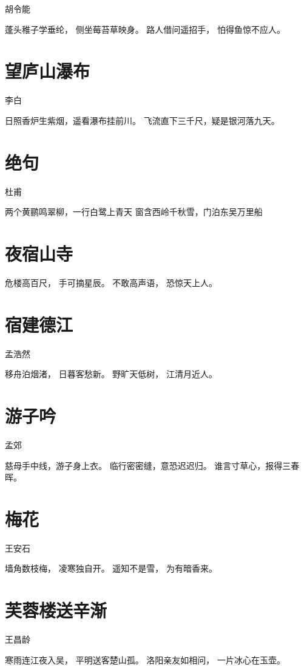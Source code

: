 \documentclass[12pt,UTF8]{ctexbook}
\begin{document}
胡令能

蓬头稚子学垂纶，
侧坐莓苔草映身。
路人借问遥招手，
怕得鱼惊不应人。

\section{望庐山瀑布}

李白

日照香炉生紫烟，遥看瀑布挂前川。
飞流直下三千尺，疑是银河落九天。

\section{绝句}

杜甫

两个黄鹂鸣翠柳，一行白鹭上青天
窗含西岭千秋雪，门泊东吴万里船

\section{夜宿山寺}

危楼高百尺，
手可摘星辰。
不敢高声语，
恐惊天上人。

\section{宿建德江}

孟浩然

移舟泊烟渚，
日暮客愁新。
野旷天低树，
江清月近人。

\section{游子吟}

孟郊

慈母手中线，游子身上衣。
临行密密缝，意恐迟迟归。
谁言寸草心，报得三春晖。

\section{梅花}

王安石

墙角数枝梅，
凌寒独自开。
遥知不是雪，
为有暗香来。

\section{芙蓉楼送辛渐}

王昌龄 

寒雨连江夜入吴，
平明送客楚山孤。
洛阳亲友如相问，
一片冰心在玉壶。
\end{document}
